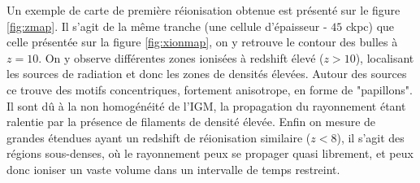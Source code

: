 
Un exemple de carte de première réionisation obtenue est présenté sur le figure \ref{fig:zmap}.
Il s'agit de la même tranche (une cellule d’épaisseur - $45$ ckpc) que celle présentée sur la figure \ref{fig:xionmap}, on y retrouve le contour des bulles à $z=10$.
On y observe différentes zones ionisées à redshift élevé ($z>10$), localisant les sources de radiation et donc les zones de densités élevées.
Autour des sources ce trouve des motifs concentriques, fortement anisotrope, en forme de "papillons".
Il sont dû à la non homogénéité de l'\ac{IGM}, la propagation du rayonnement étant ralentie par la présence de filaments de densité élevée.
Enfin on mesure de grandes étendues ayant un redshift de réionisation similaire ($z<8$), il s'agit des régions sous-denses, où le rayonnement peux se propager quasi librement, et peux donc ioniser un vaste volume dans un intervalle de temps restreint.

